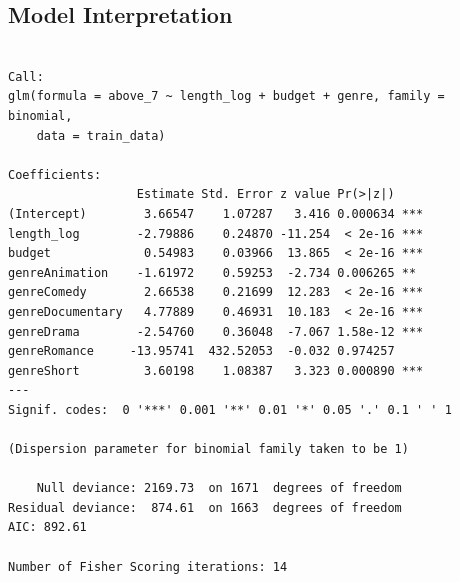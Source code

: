 \documentclass[
  11pt,
]{article}
\begin{document}
\hypertarget{model-interpretation}{%
\subsection{Model Interpretation}\label{model-interpretation}}

\begin{verbatim}

Call:
glm(formula = above_7 ~ length_log + budget + genre, family = binomial, 
    data = train_data)

Coefficients:
                  Estimate Std. Error z value Pr(>|z|)    
(Intercept)        3.66547    1.07287   3.416 0.000634 ***
length_log        -2.79886    0.24870 -11.254  < 2e-16 ***
budget             0.54983    0.03966  13.865  < 2e-16 ***
genreAnimation    -1.61972    0.59253  -2.734 0.006265 ** 
genreComedy        2.66538    0.21699  12.283  < 2e-16 ***
genreDocumentary   4.77889    0.46931  10.183  < 2e-16 ***
genreDrama        -2.54760    0.36048  -7.067 1.58e-12 ***
genreRomance     -13.95741  432.52053  -0.032 0.974257    
genreShort         3.60198    1.08387   3.323 0.000890 ***
---
Signif. codes:  0 '***' 0.001 '**' 0.01 '*' 0.05 '.' 0.1 ' ' 1

(Dispersion parameter for binomial family taken to be 1)

    Null deviance: 2169.73  on 1671  degrees of freedom
Residual deviance:  874.61  on 1663  degrees of freedom
AIC: 892.61

Number of Fisher Scoring iterations: 14
\end{verbatim}
\end{document}
